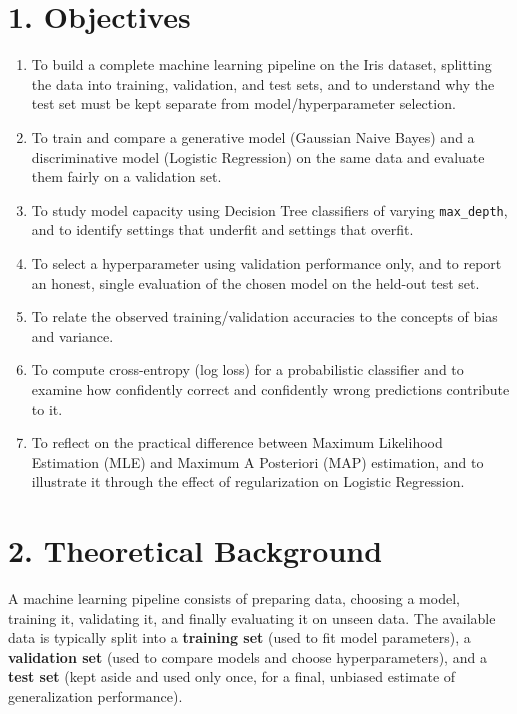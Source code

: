 \documentclass[12pt,a4paper]{article}
\begin{document}
\vfill
\newpage

\section*{1. Objectives}

\begin{enumerate}
  \item To build a complete machine learning pipeline on the Iris dataset, splitting the data into training, validation, and test sets, and to understand why the test set must be kept separate from model/hyperparameter selection.
  \item To train and compare a generative model (Gaussian Naive Bayes) and a discriminative model (Logistic Regression) on the same data and evaluate them fairly on a validation set.
  \item To study model capacity using Decision Tree classifiers of varying \texttt{max\_depth}, and to identify settings that underfit and settings that overfit.
  \item To select a hyperparameter using validation performance only, and to report an honest, single evaluation of the chosen model on the held-out test set.
  \item To relate the observed training/validation accuracies to the concepts of bias and variance.
  \item To compute cross-entropy (log loss) for a probabilistic classifier and to examine how confidently correct and confidently wrong predictions contribute to it.
  \item To reflect on the practical difference between Maximum Likelihood Estimation (MLE) and Maximum A Posteriori (MAP) estimation, and to illustrate it through the effect of regularization on Logistic Regression.
\end{enumerate}

\section*{2. Theoretical Background}

A machine learning pipeline consists of preparing data, choosing a model, training it, validating it, and finally evaluating it on unseen data. The available data is typically split into a \textbf{training set} (used to fit model parameters), a \textbf{validation set} (used to compare models and choose hyperparameters), and a \textbf{test set} (kept aside and used only once, for a final, unbiased estimate of generalization performance).
\end{document}
